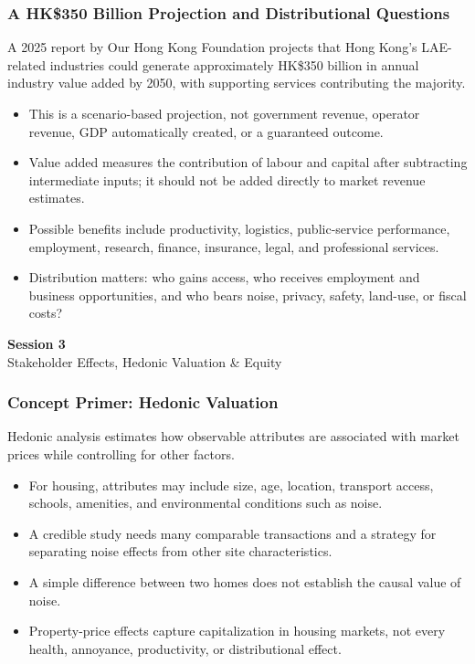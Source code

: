 \documentclass{beamer}
\begin{document}
\begin{frame}[t]
\frametitle{A HK\$350 Billion Projection and Distributional Questions}
A 2025 report by Our Hong Kong Foundation projects that Hong Kong's LAE-related industries could generate approximately HK\$350 billion in annual industry value added by 2050, with supporting services contributing the majority.
\begin{itemize}
\item This is a scenario-based projection, not government revenue, operator revenue, GDP automatically created, or a guaranteed outcome.
\item Value added measures the contribution of labour and capital after subtracting intermediate inputs; it should not be added directly to market revenue estimates.
\item Possible benefits include productivity, logistics, public-service performance, employment, research, finance, insurance, legal, and professional services.
\item Distribution matters: who gains access, who receives employment and business opportunities, and who bears noise, privacy, safety, land-use, or fiscal costs?
\end{itemize}
\end{frame}

\begin{frame}[c]
  \begin{center}
    \huge\color{cuhkpurple}\textbf{Session 3}\\
    \vspace{0.5cm}
    \Large Stakeholder Effects, Hedonic Valuation \& Equity
  \end{center}
\end{frame}

\begin{frame}[t]
\frametitle{Concept Primer: Hedonic Valuation}
Hedonic analysis estimates how observable attributes are associated with market prices while controlling for other factors.
\begin{itemize}
\item For housing, attributes may include size, age, location, transport access, schools, amenities, and environmental conditions such as noise.
\item A credible study needs many comparable transactions and a strategy for separating noise effects from other site characteristics.
\item A simple difference between two homes does not establish the causal value of noise.
\item Property-price effects capture capitalization in housing markets, not every health, annoyance, productivity, or distributional effect.
\end{itemize}
\end{frame}
\end{document}
